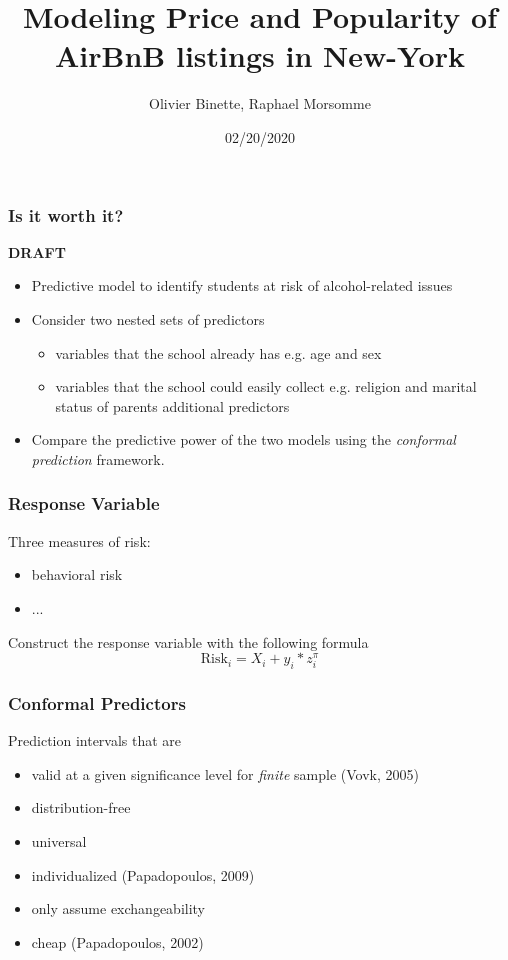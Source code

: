 \documentclass{beamer}
\title{Modeling Price and Popularity of AirBnB listings in New-York}
\author{Olivier Binette, Raphael Morsomme}
\institute{Department of Statistical Science, Duke University}
\date{02/20/2020}
\begin{document}
\frame{\titlepage}


\begin{frame} \frametitle{Is it worth it?}

\textbf{DRAFT}

\begin{itemize}
	\item Predictive model to identify students at risk of alcohol-related issues
	\item Consider two nested sets of predictors
	\begin{itemize}
		\item variables that the school already has e.g. age and sex
		\item variables that the school could easily collect e.g. religion and marital status of parents additional predictors
	\end{itemize}
	\item Compare the predictive power of the two models using the \textit{conformal prediction} framework.
\end{itemize}
\end{frame}


\begin{frame} \frametitle{Response Variable}

Three measures of risk:
\begin{itemize}
	\item behavioral risk
	\item ...
\end{itemize}

Construct the response variable with the following formula
$$\text{Risk}_i = X_i + y_i * z_i ^ \pi$$

\end{frame}


\begin{frame} \frametitle{Conformal Predictors}

Prediction intervals that are
\begin{itemize}
	\item valid at a given significance level for \textit{finite} sample (Vovk, 2005)
	\item distribution-free
	\item universal
	\item individualized (Papadopoulos, 2009)
	\item only assume exchangeability
	\item cheap (Papadopoulos, 2002)
\end{itemize}
\end{frame}
\end{document}
